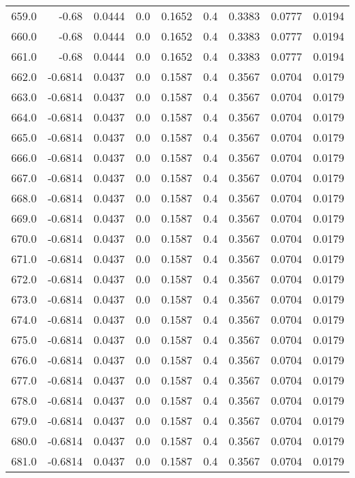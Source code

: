 \begin{longtable}{lrrrrrrrr}
659.0 & -0.68 & 0.0444 & 0.0 & 0.1652 & 0.4 & 0.3383 & 0.0777 & 0.0194 \\
660.0 & -0.68 & 0.0444 & 0.0 & 0.1652 & 0.4 & 0.3383 & 0.0777 & 0.0194 \\
661.0 & -0.68 & 0.0444 & 0.0 & 0.1652 & 0.4 & 0.3383 & 0.0777 & 0.0194 \\
662.0 & -0.6814 & 0.0437 & 0.0 & 0.1587 & 0.4 & 0.3567 & 0.0704 & 0.0179 \\
663.0 & -0.6814 & 0.0437 & 0.0 & 0.1587 & 0.4 & 0.3567 & 0.0704 & 0.0179 \\
664.0 & -0.6814 & 0.0437 & 0.0 & 0.1587 & 0.4 & 0.3567 & 0.0704 & 0.0179 \\
665.0 & -0.6814 & 0.0437 & 0.0 & 0.1587 & 0.4 & 0.3567 & 0.0704 & 0.0179 \\
666.0 & -0.6814 & 0.0437 & 0.0 & 0.1587 & 0.4 & 0.3567 & 0.0704 & 0.0179 \\
667.0 & -0.6814 & 0.0437 & 0.0 & 0.1587 & 0.4 & 0.3567 & 0.0704 & 0.0179 \\
668.0 & -0.6814 & 0.0437 & 0.0 & 0.1587 & 0.4 & 0.3567 & 0.0704 & 0.0179 \\
669.0 & -0.6814 & 0.0437 & 0.0 & 0.1587 & 0.4 & 0.3567 & 0.0704 & 0.0179 \\
670.0 & -0.6814 & 0.0437 & 0.0 & 0.1587 & 0.4 & 0.3567 & 0.0704 & 0.0179 \\
671.0 & -0.6814 & 0.0437 & 0.0 & 0.1587 & 0.4 & 0.3567 & 0.0704 & 0.0179 \\
672.0 & -0.6814 & 0.0437 & 0.0 & 0.1587 & 0.4 & 0.3567 & 0.0704 & 0.0179 \\
673.0 & -0.6814 & 0.0437 & 0.0 & 0.1587 & 0.4 & 0.3567 & 0.0704 & 0.0179 \\
674.0 & -0.6814 & 0.0437 & 0.0 & 0.1587 & 0.4 & 0.3567 & 0.0704 & 0.0179 \\
675.0 & -0.6814 & 0.0437 & 0.0 & 0.1587 & 0.4 & 0.3567 & 0.0704 & 0.0179 \\
676.0 & -0.6814 & 0.0437 & 0.0 & 0.1587 & 0.4 & 0.3567 & 0.0704 & 0.0179 \\
677.0 & -0.6814 & 0.0437 & 0.0 & 0.1587 & 0.4 & 0.3567 & 0.0704 & 0.0179 \\
678.0 & -0.6814 & 0.0437 & 0.0 & 0.1587 & 0.4 & 0.3567 & 0.0704 & 0.0179 \\
679.0 & -0.6814 & 0.0437 & 0.0 & 0.1587 & 0.4 & 0.3567 & 0.0704 & 0.0179 \\
680.0 & -0.6814 & 0.0437 & 0.0 & 0.1587 & 0.4 & 0.3567 & 0.0704 & 0.0179 \\
681.0 & -0.6814 & 0.0437 & 0.0 & 0.1587 & 0.4 & 0.3567 & 0.0704 & 0.0179 \\

\end{longtable}
